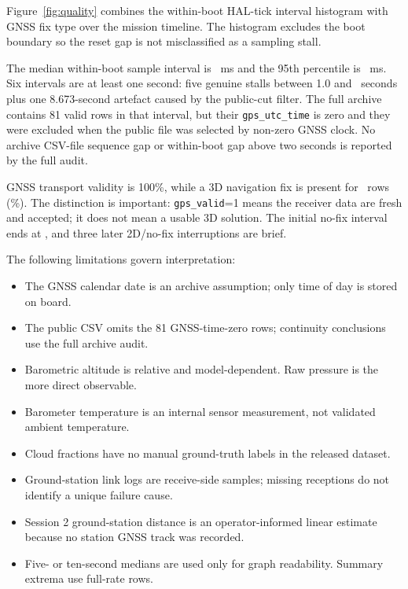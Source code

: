 \documentclass[11pt,a4paper]{article}
\begin{document}
Figure~\ref{fig:quality} combines the within-boot HAL-tick interval histogram
with GNSS fix type over the mission timeline. The histogram excludes the boot
boundary so the reset gap is not misclassified as a sampling stall.

The median within-boot sample interval is \MedianSampleMs\ ms and the 95th
percentile is \SamplePNinetyFiveMs\ ms. Six intervals are at least one second:
five genuine stalls between 1.0 and \LongestGenuineStallS\ seconds plus one
8.673-second artefact caused by the public-cut filter. The full archive contains
81 valid rows in that interval, but their \texttt{gps\_utc\_time} is zero and
they were excluded when the public file was selected by non-zero GNSS clock.
No archive CSV-file sequence gap or within-boot gap above two seconds is
reported by the full audit.

GNSS transport validity is 100\%, while a 3D navigation fix is present for
\FixThreeRows\ rows (\FixThreePercent\%). The distinction is important:
\texttt{gps\_valid}=1 means the receiver data are fresh and accepted; it does
not mean a usable 3D solution. The initial no-fix interval ends at
\FirstFixTime, and three later 2D/no-fix interruptions are brief.

The following limitations govern interpretation:

\begin{itemize}
  \item The GNSS calendar date is an archive assumption; only time of day is stored on board.
  \item The public CSV omits the 81 GNSS-time-zero rows; continuity conclusions use the full archive audit.
  \item Barometric altitude is relative and model-dependent. Raw pressure is the more direct observable.
  \item Barometer temperature is an internal sensor measurement, not validated ambient temperature.
  \item Cloud fractions have no manual ground-truth labels in the released dataset.
  \item Ground-station link logs are receive-side samples; missing receptions do not identify a unique failure cause.
  \item Session 2 ground-station distance is an operator-informed linear estimate because no station GNSS track was recorded.
  \item Five- or ten-second medians are used only for graph readability. Summary extrema use full-rate rows.
\end{itemize}
\end{document}
